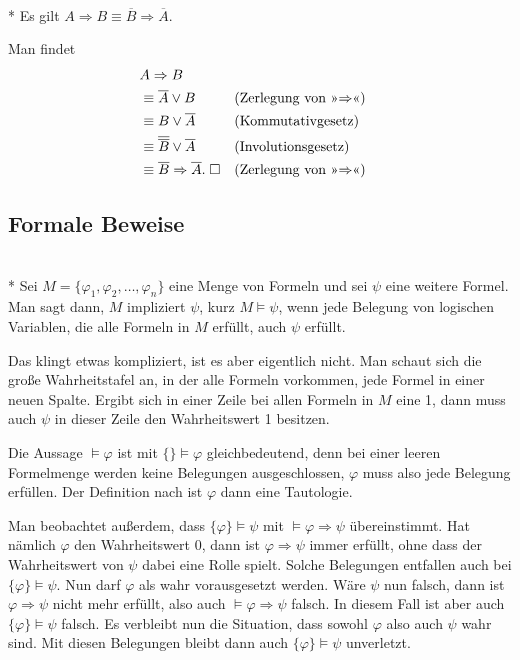 \begin{Satz}\mbox{}\\*
Es gilt $A\Rightarrow B\equiv \overline B\Rightarrow\overline A$.
\end{Satz}
 Man findet
\begin{align}
&A\Rightarrow B\\
&\equiv \overline A\lor B && (\text{Zerlegung von »$\Rightarrow$«})\\
&\equiv B\lor\overline A && (\text{Kommutativgesetz})\\
&\equiv \overline{\overline B}\lor\overline A && (\text{Involutionsgesetz})\\
&\equiv \overline B\Rightarrow\overline A.\;\Box
  && (\text{Zerlegung von »$\Rightarrow$«)}
\end{align}

\newpage
\subsection{Formale Beweise}
\begin{Definition}\mbox{}\\*
Sei $M=\{\varphi_1,\varphi_2,\ldots,\varphi_n\}$ eine Menge von
Formeln und sei $\psi$ eine weitere Formel. Man sagt dann, $M$
impliziert $\psi$, kurz $M\models\psi$, wenn jede Belegung von
logischen Variablen, die alle Formeln in $M$ erfüllt, auch $\psi$
erfüllt.
\end{Definition}
Das klingt etwas kompliziert, ist es aber eigentlich nicht. Man schaut
sich die große Wahrheitstafel an, in der alle Formeln vorkommen,
jede Formel in einer neuen Spalte.
Ergibt sich in einer Zeile bei allen Formeln in $M$ eine 1, dann muss
auch $\psi$ in dieser Zeile den Wahrheitswert 1 besitzen.

Die Aussage $\models\varphi$ ist mit $\{\}\models\varphi$
gleichbedeutend, denn bei einer leeren Formelmenge werden keine
Belegungen ausgeschlossen, $\varphi$ muss also jede Belegung
erfüllen. Der Definition nach ist $\varphi$ dann eine Tautologie.

Man beobachtet außerdem, dass $\{\varphi\}\models\psi$ mit
$\models\varphi\Rightarrow\psi$ übereinstimmt. Hat nämlich
$\varphi$ den Wahrheitswert 0, dann ist $\varphi\Rightarrow\psi$
immer erfüllt, ohne dass der Wahrheitswert von $\psi$ dabei eine
Rolle spielt. Solche Belegungen entfallen auch bei
$\{\varphi\}\models\psi$. Nun darf $\varphi$ als wahr vorausgesetzt
werden. Wäre $\psi$ nun falsch, dann ist $\varphi\Rightarrow\psi$
nicht mehr erfüllt, also auch $\models\varphi\Rightarrow\psi$ falsch.
In diesem Fall ist aber auch $\{\varphi\}\models\psi$ falsch.
Es verbleibt nun die Situation, dass sowohl $\varphi$ also auch
$\psi$ wahr sind. Mit diesen Belegungen bleibt dann auch
$\{\varphi\}\models\psi$ unverletzt.

